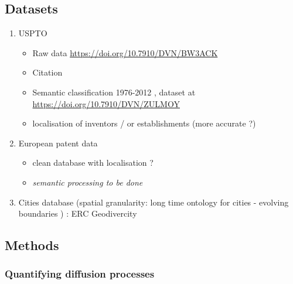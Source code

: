 \subsection{Datasets}

\begin{enumerate}
	\item USPTO
    \begin{itemize}
    	\item Raw data \url{https://doi.org/10.7910/DVN/BW3ACK}
        \item Citation
        \item Semantic classification 1976-2012 \cite{bergeaud2017classifying}, dataset at \url{https://doi.org/10.7910/DVN/ZULMOY}
        \item localisation of inventors / or establishments (more accurate ?) \cite{li2014disambiguation}
    \end{itemize}
	\item European patent data 
    \begin{itemize}
    	\item clean database with localisation ?
        \item \textit{semantic processing to be done}
     \end{itemize}
	\item Cities database (spatial granularity: long time ontology for cities - evolving boundaries \cite{bretagnolle2009villes}) : ERC Geodivercity
\end{enumerate}


\subsection{Methods}

\subsubsection{Quantifying diffusion processes}


